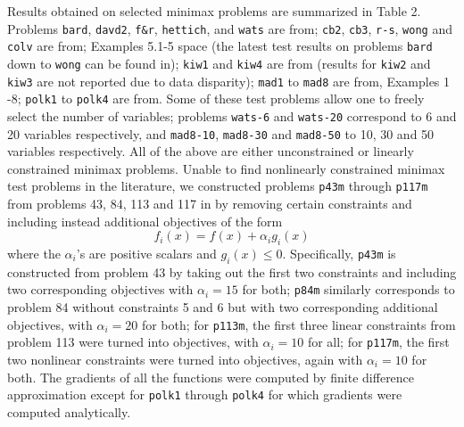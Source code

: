 Results obtained on selected minimax problems 
are summarized in Table 2.
Problems {\tt bard}, {\tt davd2}, {\tt f\&r}, {\tt hettich}, 
and {\tt wats} are
from\Lspace {}\Rcitemark \Rspace{};
{\tt cb2}, {\tt cb3}, {\tt r-s}, {\tt wong} and {\tt colv} are 
from\Lspace {}\LIcitemark{}; Examples 5.1-5\RIcitemark \Rcitemark \R
space{} 
(the latest test results on problems {\tt bard} down to
{\tt wong} can be found in\Lspace {}\Rcitemark \Rspace{});
{\tt kiw1} and {\tt kiw4} are from\Lspace {}\Rcitemark \Rspace{}
(results for {\tt kiw2} and {\tt kiw3} are not reported due to 
data disparity);
{\tt mad1} to {\tt mad8} are from\Lspace {}\LIcitemark{}, Examples 1
-8\RIcitemark \Rcitemark \Rspace{};
{\tt polk1} to {\tt polk4} are from\Lspace {}\Rcitemark \Rspace{}.
Some of these test problems allow one to freely select 
the number of variables;
problems {\tt wats-6} and {\tt wats-20} correspond to 6 and 20 
variables respectively,
and {\tt mad8-10}, {\tt mad8-30} and {\tt mad8-50} to 10, 30 and 50
variables respectively.
All of the above are either
unconstrained or linearly constrained minimax problems. Unable to find
nonlinearly constrained minimax test problems in the literature, we 
constructed problems {\tt p43m} through {\tt p117m} from problems
43, 84, 113 and 117 in\Lspace {}\Rcitemark \Rspace{}
by removing certain constraints and including instead 
additional objectives of the form
$$f_i(x)=f(x)+\alpha _ig_i(x)$$
where the $\alpha _i$'s are positive scalars and $g_i(x)\leq 0.$ 
Specifically, {\tt p43m}
is constructed from problem 43 by taking out the first 
two constraints and 
including two corresponding objectives with $\alpha _i=15$ for both;
{\tt p84m} similarly corresponds to problem 84 without 
constraints 5 and 6 but
with two corresponding additional objectives, 
with $\alpha _i=20$ for both;
for {\tt p113m}, the first three linear constraints from problem 113
were turned into objectives, with $\alpha _i=10$ for all; 
for {\tt p117m},
the first two nonlinear constraints were turned into objectives, 
again with $\alpha _i=10$ for both.
The gradients of all the functions were computed by finite difference 
approximation except for {\tt polk1} through {\tt polk4} for which 
gradients were computed analytically.

